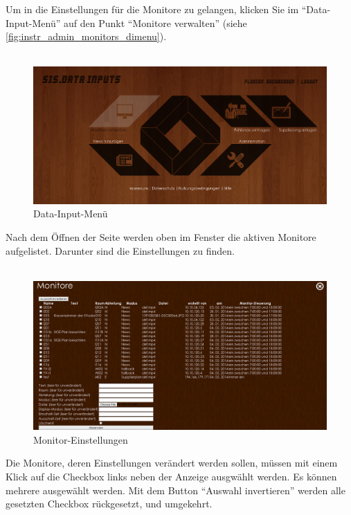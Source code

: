 Um in die Einstellungen für die Monitore zu gelangen, klicken Sie im \enquote{Data-Input-Menü} auf den Punkt \enquote{Monitore verwalten} (siehe \autoref{fig:instr_admin_monitors_dimenu}).\\
\\
\begin{figure}[H]
\centering
\includegraphics[keepaspectratio=true, width=14cm]{images/screenshots/data-inputs.png}
\caption{Data-Input-Menü}
\label{fig:instr_admin_monitors_dimenu}
\end{figure}
Nach dem Öffnen der Seite werden oben im Fenster die aktiven Monitore aufgelistet. Darunter sind die Einstellungen zu finden.\\
\\
\begin{figure}[H]
\centering
\includegraphics[keepaspectratio=true, width=14cm]{images/screenshots/monitors.png}
\caption{Monitor-Einstellungen}
\label{fig:instr_admin_monitors_site}
\end{figure}
Die Monitore, deren Einstellungen verändert werden sollen, müssen mit einem Klick auf die Checkbox links neben der Anzeige ausgwählt werden. Es können mehrere ausgewählt werden. Mit dem Button \enquote{Auswahl invertieren} werden alle gesetzten Checkbox rückgesetzt, und umgekehrt.
\\
